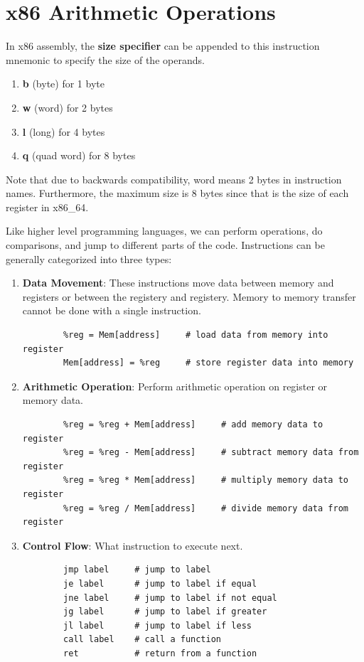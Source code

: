 \section{x86 Arithmetic Operations} 

  \begin{definition}
    In x86 assembly, the \textbf{size specifier} can be appended to this instruction mnemonic to specify the size of the operands. 
    \begin{enumerate} 
      \item \textbf{b} (byte) for 1 byte 
      \item \textbf{w} (word) for 2 bytes
      \item \textbf{l} (long) for 4 bytes 
      \item \textbf{q} (quad word) for 8 bytes
    \end{enumerate}
    Note that due to backwards compatibility, word means 2 bytes in instruction names. Furthermore, the maximum size is 8 bytes since that is the size of each register in x86\_64. 
  \end{definition}

  Like higher level programming languages, we can perform operations, do comparisons, and jump to different parts of the code. Instructions can be generally categorized into three types: 
  \begin{enumerate} 
    \item \textbf{Data Movement}: These instructions move data between memory and registers or between the registery and registery. Memory to memory transfer cannot be done with a single instruction. 
      \begin{lstlisting} 
        %reg = Mem[address]     # load data from memory into register
        Mem[address] = %reg     # store register data into memory
      \end{lstlisting}
    \item \textbf{Arithmetic Operation}: Perform arithmetic operation on register or memory data. 
      \begin{lstlisting} 
        %reg = %reg + Mem[address]     # add memory data to register
        %reg = %reg - Mem[address]     # subtract memory data from register
        %reg = %reg * Mem[address]     # multiply memory data to register
        %reg = %reg / Mem[address]     # divide memory data from register
      \end{lstlisting}
    \item \textbf{Control Flow}: What instruction to execute next. 
      \begin{lstlisting} 
        jmp label     # jump to label
        je label      # jump to label if equal
        jne label     # jump to label if not equal
        jg label      # jump to label if greater
        jl label      # jump to label if less
        call label    # call a function
        ret           # return from a function
      \end{lstlisting}
  \end{enumerate}

